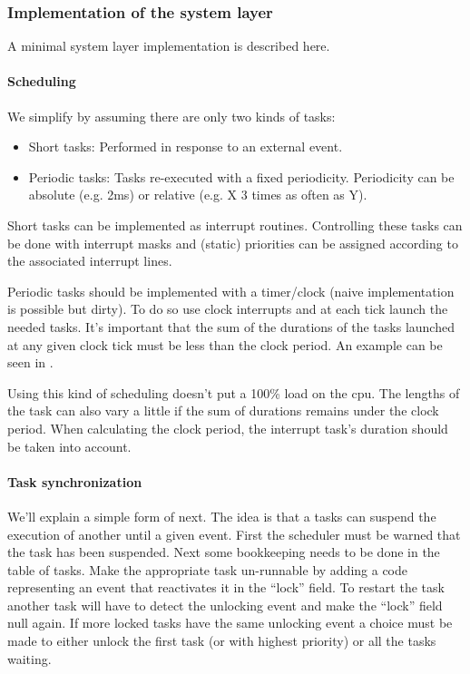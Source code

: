 \subsubsection{Implementation of the system layer}
A minimal  system layer implementation is described here.

\paragraph{Scheduling}
We simplify  by assuming there are only two kinds of tasks:
\begin{itemize}
	\item Short tasks: Performed in response to an external event.
	\item Periodic tasks: Tasks re-executed with a fixed periodicity. Periodicity can be absolute (e.g. 2ms) or relative (e.g. X 3 times as often as Y).
\end{itemize}

Short tasks can be implemented as interrupt routines. 
Controlling these tasks can be done with interrupt masks and (static) priorities can be assigned according to the associated interrupt lines.

Periodic tasks should be implemented with a timer/clock (naive implementation is possible but dirty).
To do so use clock interrupts and at each tick launch the needed tasks.
It's important that the sum of the durations of the tasks launched at any given clock tick must be less than the clock period. 
An example can be seen in .


Using this kind of scheduling doesn't put a 100\% load on the cpu.
The lengths of the task can also vary a little if the sum of durations remains under the clock period.
When calculating the clock period, the interrupt task's duration should be taken into account.

\paragraph{Task synchronization}
We'll explain a simple form of  next. 
The idea is that a tasks can suspend the execution of another until a given event.
First the scheduler must be warned that the task has been suspended.
Next some bookkeeping needs to be done in the table of tasks.
Make the appropriate task un-runnable by adding a code representing an event that reactivates it in the ``lock'' field.
To restart the task another task will have to detect the unlocking event and make the ``lock'' field null again. 
If more locked tasks have the same unlocking event a choice must be made to either unlock the first task (or with highest priority) or all the tasks waiting. 

